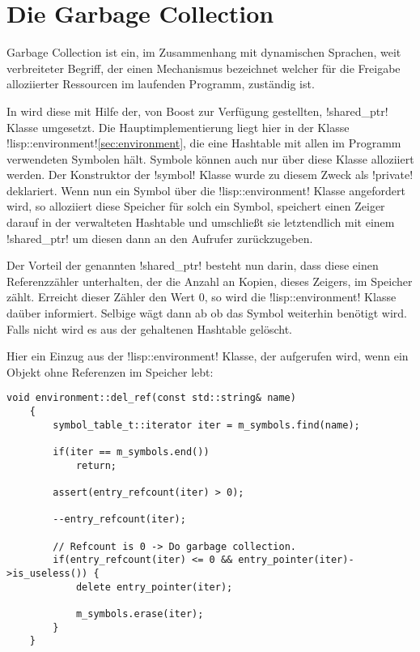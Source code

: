 \section{Die Garbage Collection}
\label{sec:shared_ptr}

Garbage Collection ist ein, im Zusammenhang mit dynamischen Sprachen,
weit verbreiteter Begriff, der
einen Mechanismus bezeichnet welcher für die Freigabe alloziierter
Ressourcen im laufenden Programm, zuständig
ist.

In \projectname{} wird diese mit Hilfe der, von Boost zur Verfügung
gestellten, !shared_ptr! Klasse umgesetzt.
Die Hauptimplementierung liegt hier in der Klasse !lisp::environment!\ref{sec:environment},
die eine Hashtable mit allen
im Programm verwendeten Symbolen hält.
Symbole können auch nur über diese Klasse alloziiert werden.
Der Konstruktor der !symbol! Klasse wurde zu diesem Zweck als !private! deklariert.
Wenn nun ein Symbol über die !lisp::environment! Klasse angefordert wird,
so alloziiert diese Speicher für solch ein Symbol,
speichert einen Zeiger darauf in der verwalteten Hashtable
und umschließt sie letztendlich mit einem !shared_ptr!
um diesen dann an den Aufrufer zurückzugeben.

Der Vorteil der genannten !shared_ptr! besteht nun darin,
dass diese einen Referenzzähler unterhalten,
der die Anzahl an Kopien, dieses Zeigers, im Speicher zählt.
Erreicht dieser Zähler den Wert 0, so
wird die !lisp::environment! Klasse daüber informiert.
Selbige wägt dann ab ob das Symbol weiterhin benötigt
wird. Falls nicht wird es aus der gehaltenen Hashtable gelöscht.

Hier ein Einzug aus der !lisp::environment! Klasse, der aufgerufen wird, wenn
ein Objekt ohne Referenzen im Speicher lebt:

\begin{lstlisting}[caption={Symbolbeseitigung}, label=lst:del_ref]
    void environment::del_ref(const std::string& name) 
    {
        symbol_table_t::iterator iter = m_symbols.find(name);

        if(iter == m_symbols.end())
            return;

        assert(entry_refcount(iter) > 0);

        --entry_refcount(iter);

        // Refcount is 0 -> Do garbage collection.
        if(entry_refcount(iter) <= 0 && entry_pointer(iter)->is_useless()) {
            delete entry_pointer(iter);

            m_symbols.erase(iter);
        }
    }
\end{lstlisting}



